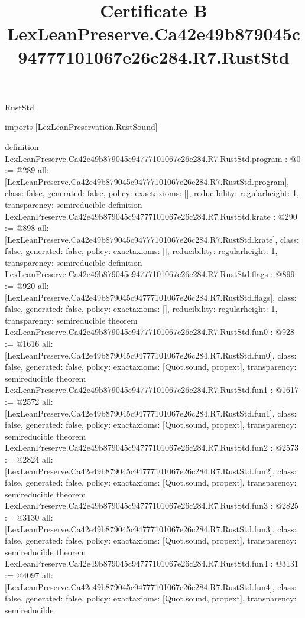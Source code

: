 \begin{lexlean}{RustStd}
\title{Certificate B LexLeanPreserve.Ca42e49b879045c94777101067e26c284.R7.RustStd}
\begin{coremodule}
imports [LexLeanPreservation.RustSound]

definition LexLeanPreserve.Ca42e49b879045c94777101067e26c284.R7.RustStd.program : @0 := @289 {
  all: [LexLeanPreserve.Ca42e49b879045c94777101067e26c284.R7.RustStd.program],
  class: false,
  generated: false,
  policy: exact{axioms: []},
  reducibility: regular{height: 1},
  transparency: semireducible
}
definition LexLeanPreserve.Ca42e49b879045c94777101067e26c284.R7.RustStd.krate : @290 := @898 {
  all: [LexLeanPreserve.Ca42e49b879045c94777101067e26c284.R7.RustStd.krate],
  class: false,
  generated: false,
  policy: exact{axioms: []},
  reducibility: regular{height: 1},
  transparency: semireducible
}
definition LexLeanPreserve.Ca42e49b879045c94777101067e26c284.R7.RustStd.flags : @899 := @920 {
  all: [LexLeanPreserve.Ca42e49b879045c94777101067e26c284.R7.RustStd.flags],
  class: false,
  generated: false,
  policy: exact{axioms: []},
  reducibility: regular{height: 1},
  transparency: semireducible
}
theorem LexLeanPreserve.Ca42e49b879045c94777101067e26c284.R7.RustStd.fun0 : @928 := @1616 {
  all: [LexLeanPreserve.Ca42e49b879045c94777101067e26c284.R7.RustStd.fun0],
  class: false,
  generated: false,
  policy: exact{axioms: [Quot.sound, propext]},
  transparency: semireducible
}
theorem LexLeanPreserve.Ca42e49b879045c94777101067e26c284.R7.RustStd.fun1 : @1617 := @2572 {
  all: [LexLeanPreserve.Ca42e49b879045c94777101067e26c284.R7.RustStd.fun1],
  class: false,
  generated: false,
  policy: exact{axioms: [Quot.sound, propext]},
  transparency: semireducible
}
theorem LexLeanPreserve.Ca42e49b879045c94777101067e26c284.R7.RustStd.fun2 : @2573 := @2824 {
  all: [LexLeanPreserve.Ca42e49b879045c94777101067e26c284.R7.RustStd.fun2],
  class: false,
  generated: false,
  policy: exact{axioms: [Quot.sound, propext]},
  transparency: semireducible
}
theorem LexLeanPreserve.Ca42e49b879045c94777101067e26c284.R7.RustStd.fun3 : @2825 := @3130 {
  all: [LexLeanPreserve.Ca42e49b879045c94777101067e26c284.R7.RustStd.fun3],
  class: false,
  generated: false,
  policy: exact{axioms: [Quot.sound, propext]},
  transparency: semireducible
}
theorem LexLeanPreserve.Ca42e49b879045c94777101067e26c284.R7.RustStd.fun4 : @3131 := @4097 {
  all: [LexLeanPreserve.Ca42e49b879045c94777101067e26c284.R7.RustStd.fun4],
  class: false,
  generated: false,
  policy: exact{axioms: [Quot.sound, propext]},
  transparency: semireducible
}
\end{coremodule}
\end{lexlean}
